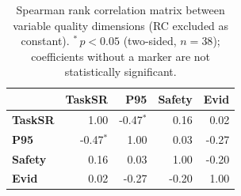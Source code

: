 \begin{table}[htbp]
\renewcommand{\arraystretch}{1.2}
\centering
\small
\setlength{\tabcolsep}{3pt}
\caption{Spearman rank correlation matrix between variable quality dimensions (RC excluded as constant). $^{*}$\,$p<0.05$ (two-sided, $n=38$); coefficients without a marker are not statistically significant.}
\label{tab:correlations}
\begin{tabular}{lrrrr}
\toprule
 & \textbf{TaskSR} & \textbf{P95} & \textbf{Safety} & \textbf{Evid} \\
\midrule
\textbf{TaskSR} & 1.00 & -0.47$^{*}$ & 0.16 & 0.02 \\
\textbf{P95} & -0.47$^{*}$ & 1.00 & 0.03 & -0.27 \\
\textbf{Safety} & 0.16 & 0.03 & 1.00 & -0.20 \\
\textbf{Evid} & 0.02 & -0.27 & -0.20 & 1.00 \\
\bottomrule
\end{tabular}
\setlength{\tabcolsep}{6pt}
\end{table}
